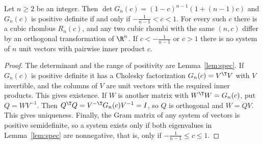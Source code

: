 \begin{theorem}\label{thm:main}
Let $n\ge2$ be an integer. Then $\det G_n(c)=(1-c)^{n-1}(1+(n-1)c)$ and $G_n(c)$ is positive definite if and only if $-\frac{1}{n-1}<c<1$.
For every such $c$ there is a cubic rhombus $R_n(c)$, and any two cubic rhombi with the same $(n,c)$ differ by an orthogonal transformation of $\R^n$.
If $c<-\frac{1}{n-1}$ or $c>1$ there is no system of $n$ unit vectors with pairwise inner product $c$.
\end{theorem}
\begin{proof}
The determinant and the range of positivity are Lemma~\ref{lem:spec}.
If $G_n(c)$ is positive definite it has a Cholesky factorization $G_n(c)=V^\T V$ with $V$ invertible, and the columns of $V$ are unit vectors with the required inner products. This gives existence.
If $W$ is another matrix with $W^\T W=G_n(c)$, put $Q=WV^{-1}$. Then $Q^\T Q=V^{-\T}G_n(c)V^{-1}=I$, so $Q$ is orthogonal and $W=QV$. This gives uniqueness.
Finally, the Gram matrix of any system of vectors is positive semidefinite, so a system exists only if both eigenvalues in Lemma~\ref{lem:spec} are nonnegative, that is, only if $-\frac{1}{n-1}\le c\le1$.
\end{proof}
